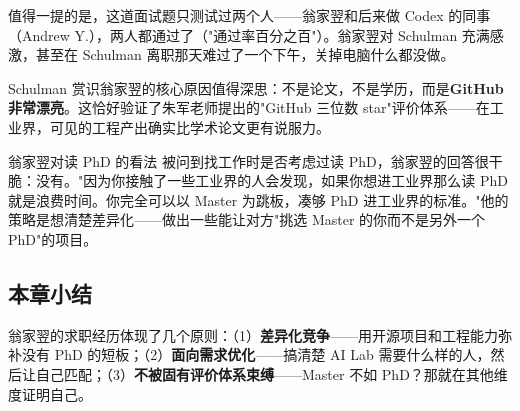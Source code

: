 值得一提的是，这道面试题只测试过两个人——翁家翌和后来做 Codex 的同事（Andrew Y.），两人都通过了（"通过率百分之百"）。翁家翌对 Schulman 充满感激，甚至在 Schulman 离职那天难过了一个下午，关掉电脑什么都没做。

Schulman 赏识翁家翌的核心原因值得深思：不是论文，不是学历，而是\textbf{GitHub 非常漂亮}。这恰好验证了朱军老师提出的"GitHub 三位数 star"评价体系——在工业界，可见的工程产出确实比学术论文更有说服力。

\begin{knowledgebox}{翁家翌对读 PhD 的看法}
被问到找工作时是否考虑过读 PhD，翁家翌的回答很干脆：没有。"因为你接触了一些工业界的人会发现，如果你想进工业界那么读 PhD 就是浪费时间。你完全可以以 Master 为跳板，凑够 PhD 进工业界的标准。"他的策略是想清楚差异化——做出一些能让对方"挑选 Master 的你而不是另外一个 PhD"的项目。
\end{knowledgebox}

\subsection{本章小结}

翁家翌的求职经历体现了几个原则：（1）\textbf{差异化竞争}——用开源项目和工程能力弥补没有 PhD 的短板；（2）\textbf{面向需求优化}——搞清楚 AI Lab 需要什么样的人，然后让自己匹配；（3）\textbf{不被固有评价体系束缚}——Master 不如 PhD？那就在其他维度证明自己。


